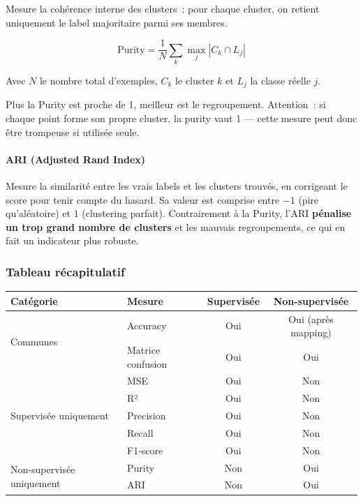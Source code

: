 \documentclass[12pt,a4paper]{report}
\renewcommand{\arraystretch}{1}
\begin{document}
Mesure la cohérence interne des clusters~: pour chaque cluster, on retient uniquement le label majoritaire parmi ses membres.

\[
  \text{Purity} = \frac{1}{N}\sum_k \max_j |C_k \cap L_j|
\]

Avec $N$ le nombre total d'exemples, $C_k$ le cluster $k$ et $L_j$ la classe réelle $j$.

\begin{note}[Remarque]
Plus la Purity est proche de 1, meilleur est le regroupement. Attention~: si chaque point forme son propre cluster, la purity vaut 1 --- cette mesure peut donc être trompeuse si utilisée seule.
\end{note}

\paragraph{ARI (Adjusted Rand Index)}

Mesure la similarité entre les vrais labels et les clusters trouvés, en corrigeant le score pour tenir compte du hasard. Sa valeur est comprise entre $-1$ (pire qu'aléatoire) et $1$ (clustering parfait). Contrairement à la Purity, l'ARI \textbf{pénalise un trop grand nombre de clusters} et les mauvais regroupements, ce qui en fait un indicateur plus robuste.

\subsubsection{Tableau récapitulatif}

\begin{center}
\renewcommand{\arraystretch}{1.2}
\begin{tabular}{llcc}
\toprule
\textbf{Catégorie} & \textbf{Mesure} & \textbf{Supervisée} & \textbf{Non-supervisée} \\
\midrule
\multirow{2}{*}{Communes}
  & Accuracy          & Oui & Oui (après mapping) \\
  & Matrice confusion & Oui & Oui \\
\midrule
\multirow{5}{*}{Supervisée uniquement}
  & MSE               & Oui & Non \\
  & R²                & Oui & Non \\
  & Precision         & Oui & Non \\
  & Recall            & Oui & Non \\
  & F1-score          & Oui & Non \\
\midrule
\multirow{2}{*}{Non-supervisée uniquement}
  & Purity            & Non & Oui \\
  & ARI               & Non & Oui \\
\bottomrule
\end{tabular}
\end{center}
\end{document}
